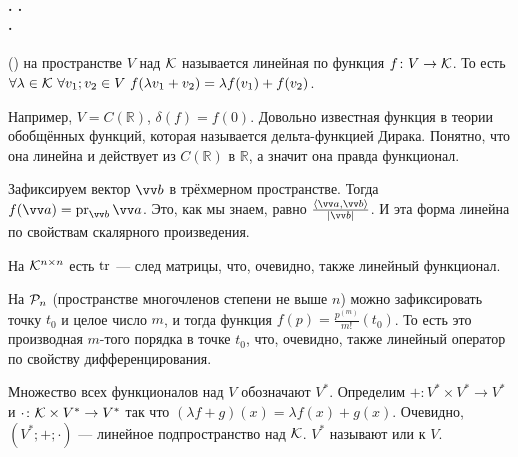 \documentclass{article}
\let\vec\vv
\begin{document}
    \paragraph{. .\\.}
    \begin{itemize}
        \dfn {} () на пространстве $V$ над ${\mathcal{K}}$ называется линейная по функция $f\colon V\to{\mathcal{K}}$. То есть $\forall\lambda\in{\mathcal{K}}~\forall v_1;v_2\in V~f(\lambda v_1+v_2)=\lambda f(v_1)+f(v_2)$.
        \begin{Example}
            Например, $V=C(\mathbb R)$, $\delta(f)=f(0)$. Довольно известная функция в теории обобщённых функций, которая называется дельта-функцией Дирака. Понятно, что она линейна и действует из $C(\mathbb R)$ в $\mathbb R$, а значит она правда функционал.
        \end{Example}
        \begin{Example}
            Зафиксируем вектор $\vec b$ в трёхмерном пространстве. Тогда $f(\vec a)=\proj_{\vec b}\vec a$. Это, как мы знаем, равно $\frac{\dotprod{\vec a}{\vec b}}{|\vec b|}$. И эта форма линейна по свойствам скалярного произведения.
        \end{Example}
        \begin{Example}
            На ${\mathcal{K}}^{n\times n}$ есть $\operatorname{tr}$ --- след матрицы, что, очевидно, также линейный функционал.
        \end{Example}
        \begin{Example}
            На ${\mathcal{P}}_n$ (пространстве многочленов степени не выше $n$) можно зафиксировать точку $t_0$ и целое число $m$, и тогда функция $f(p)=\frac{p^{(m)}}{m!}(t_0)$. То есть это производная $m$-того порядка в точке $t_0$, что, очевидно, также линейный оператор по свойству дифференцирования.
        \end{Example}
        \dfn Множество всех функционалов над $V$ обозначают $V^*$. Определим  $+\colon V^*\times V^*\to V^*$ и  $\cdot\colon{\mathcal{K}}\times V^*\to V^*$ так что $(\lambda f+g)(x)=\lambda f(x)+g(x)$.
        \thm Очевидно, $(V^*;+;\cdot)$ --- линейное подпространство над ${\mathcal{K}}$.
        \dfn $V^*$ называют  или  к $V$.

\end{itemize}
\end{document}

